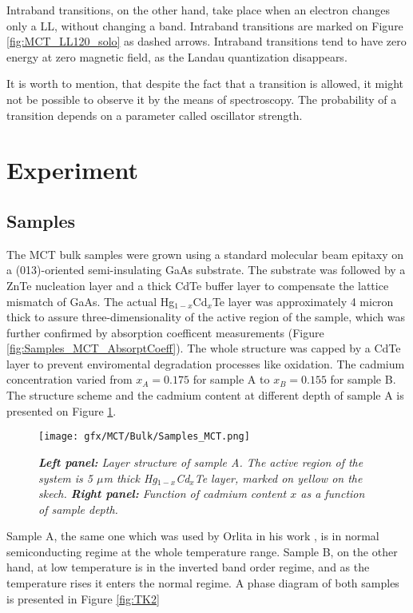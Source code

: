 \documentclass[titlepage,a4paper]{book}
\newcommand{\wciecie}{\quad\phantom{v}}
\begin{document}
Intraband transitions, on the other hand, take place when an electron changes only a LL, without changing a band. Intraband transitions are marked on Figure \ref{fig:MCT_LL120_solo} as dashed arrows. Intraband transitions tend to have zero energy at zero magnetic field, as the Landau quantization disappears.

It is worth to mention, that despite the fact that a transition is allowed, it might not be possible to observe it by the means of spectroscopy. The probability of a transition depends on a parameter called oscillator strength.

\clearpage
\section{Experiment}
\subsection{Samples}
\wciecie
The MCT bulk samples were grown using a standard molecular beam epitaxy on a (013)-oriented semi-insulating GaAs substrate. The substrate was followed by a ZnTe nucleation layer and a thick CdTe buffer layer to compensate the lattice mismatch of GaAs. The actual Hg$_{1-x}$Cd$_x$Te layer was approximately 4 micron thick to assure three-dimensionality of the active region of the sample, which was further confirmed by absorption coefficent measurements (Figure \ref{fig:Samples_MCT_AbsorptCoeff}). The whole structure was capped by a CdTe layer to prevent enviromental degradation processes like oxidation. The cadmium concentration varied from $x_A = 0.175$ for sample A to $x_B = 0.155$ for sample B.  The structure scheme and the cadmium content at different depth of sample A is presented on Figure \ref{fig:Samples_MCT}. 

\begin{figure}[ht]
	\centering
	\texttt{[image: gfx/MCT/Bulk/Samples\_MCT.png]}
	\vspace{-10pt}
	\caption{\textit{\textbf{Left panel:} Layer structure of sample A. The active region of the system is 5 $\mu$m thick Hg$_{1-x}$Cd$_x$Te layer, marked on yellow on the skech. \textbf{Right panel:} Function of cadmium content $x$ as a function of sample depth.}}
	\label{fig:Samples_MCT}
\end{figure} 

Sample A, the same one which was used by Orlita in his work \cite{Orlita_MCT}, is in normal semiconducting regime at the whole temperature range. Sample B, on the other hand, at low temperature is in the inverted band order regime, and as the temperature rises it enters the normal regime. A phase diagram of both samples is presented in Figure \ref{fig:TK2}
\end{document}
